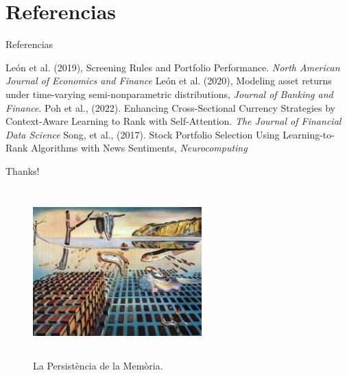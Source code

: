 \documentclass[ucs,8pt,handout]{beamer}
\begin{document}
\section{Referencias}
\begin{frame}{Referencias}
  \begin{thebibliography}{9}
       Le\'on et al. (2019), Screening Rules and Portfolio
        Performance. \emph{North American Journal of Economics and
        Finance} 
   Le\'on et al. (2020), Modeling asset returns under
  time-varying semi-nonparametric distributions, \emph{Journal of
  Banking and Finance}. 
   Poh et al., (2022). Enhancing
    Cross-Sectional Currency Strategies by Context-Aware Learning to
    Rank with Self-Attention. \emph{The Journal of Financial Data
    Science}
 Song, et al., (2017). Stock Portfolio Selection
  Using Learning-to-Rank Algorithms with News Sentiments, \emph{Neurocomputing}
  \end{thebibliography}
\end{frame}

\begin{frame}{Thanks!}
  \begin{figure}
    \centering
    \includegraphics[height=6.5cm,width=6.5cm]{texdata/PersistenceMemory.jpg}\caption{La Persist\`encia de la Mem\`oria.}
  \end{figure}
  
\end{frame}
\end{document}
